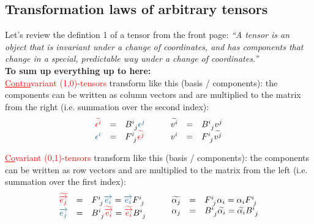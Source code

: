 \subsection{Transformation laws of arbitrary tensors}
Let's review the defintion 1 of a tensor from the front page: \emph{``A tensor is an
object that is invariant under a change of coordinates, and has components that change in
a special, predictable way under a change of coordinates.''} \\

\textbf{To sum up everything up to here:}\\

\textcolor{red}{\underline{Contra}variant (1,0)-tensors} transform like this (basis /
components): the components can be written as column vectors and are multiplied to the
matrix from the right (i.e. summation over the second index):
\begin{equation}
    \begin{array}{rcl}
        \hdcbtvc{i} & = & B^{i~}_{~j} \hdcbvc{j} \\
        \hdcbvc{i} & = & F^{i~}_{~j}  \hdcbtvc{j}
    \end{array}
    \qquad
    \begin{array}{rcl}
        \hdtvc{i} & = & B^{i~}_{~j} \hdvc{j} \\
        \hdvc{i} & = & F^{i~}_{~j}  \hdtvc{j}
    \end{array}
\end{equation}

\textcolor{red}{\underline{Co}variant (0,1)-tensors} transform like this (basis /
components): the components can be written as row vectors and are multiplied to the
matrix from the left (i.e. summation over the first index):
\begin{equation}
    \begin{array}{rcl}
        \hdbtv{j} & = & F^{i~}_{~j} \hdbv{i} = \hdbv{i}  F^{i~}_{~j} \\
        \hdbv{j} & = & B^{i~}_{~j} \hdbtv{i} = \hdbtv{i} B^{i~}_{~j} 
    \end{array}
    \qquad
    \begin{array}{rcl}
        \widetilde{\alpha_j} & = & F^{i~}_{~j} \alpha_i = \alpha_i F^{i~}_{~j} \\
        {\alpha_j} & = & B^{i~}_{~j} \widetilde{\alpha_i} =
        \widetilde{\alpha_i} B^{i~}_{~j}
    \end{array}
\end{equation}

